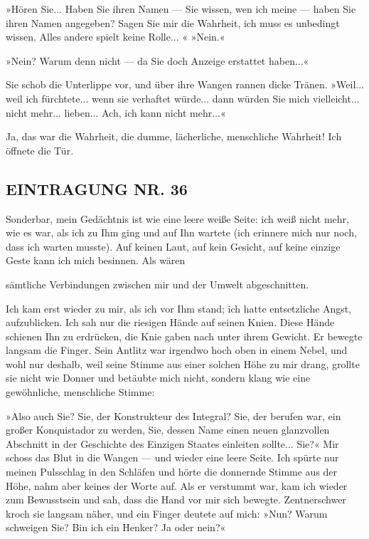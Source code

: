 »Hören Sie... Haben Sie ihren Namen — Sie wissen, wen ich meine —
haben Sie ihren Namen angegeben? Sagen Sie mir die Wahrheit, ich
muss es unbedingt wissen. Alles andere spielt keine Rolle... «
»Nein.«

»Nein? Warum denn nicht — da Sie doch Anzeige erstattet haben...«

Sie schob die Unterlippe vor, und über ihre Wangen rannen dicke
Tränen. »Weil... weil ich fürchtete... wenn sie verhaftet würde...
dann würden Sie mich vielleicht... nicht mehr... lieben... Ach, ich
kann nicht mehr...«

Ja, das war die Wahrheit, die dumme, lächerliche, menschliche
Wahrheit! Ich öffnete die Tür.

\subsection{EINTRAGUNG NR. 36}

Sonderbar, mein Gedächtnis ist wie eine leere weiße Seite: ich weiß
nicht mehr, wie es war, als ich zu Ihm ging und auf Ihn wartete
(ich erinnere mich nur noch, dass ich warten musste). Auf keinen
Laut, auf kein Gesicht, auf keine einzige Geste kann ich mich
besinnen. Als wären

sämtliche Verbindungen zwischen mir und der Umwelt abgeschnitten.

Ich kam erst wieder zu mir, als ich vor Ihm stand; ich hatte
entsetzliche Angst, aufzublicken. Ich sah nur die riesigen Hände
auf seinen Knien. Diese Hände schienen Ihn zu erdrücken, die Knie
gaben nach unter ihrem Gewicht. Er bewegte langsam die Finger. Sein
Antlitz war irgendwo hoch oben in einem Nebel, und wohl nur
deshalb, weil seine Stimme aus einer solchen Höhe zu mir drang,
grollte sie nicht wie Donner und betäubte mich nicht, sondern klang
wie eine gewöhnliche, menschliche Stimme:

»Also auch Sie? Sie, der Konstrukteur des Integral? Sie, der
berufen war, ein großer Konquistador zu werden, Sie, dessen Name
einen neuen glanzvollen Abschnitt in der Geschichte des Einzigen
Staates einleiten sollte... Sie?« Mir schoss das Blut in die Wangen
— und wieder eine leere Seite. Ich spürte nur meinen Pulsschlag in
den Schläfen und hörte die donnernde Stimme aus der Höhe, nahm aber
keines der Worte auf. Als er verstummt war, kam ich wieder zum
Bewusstsein und sah, dass die Hand vor mir sich bewegte.
Zentnerschwer kroch sie langsam näher, und ein Finger deutete auf
mich: »Nun? Warum schweigen Sie? Bin ich ein Henker? Ja oder
nein?«

